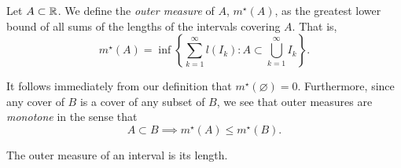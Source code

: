 \begin{definition}
	Let $A \subset \mathbb{R}$.
	We define the \emph{outer measure} of $A$, $m^\star(A)$,
	as the greatest lower bound of all sums of the lengths of the intervals
	covering $A$.
	That is,
	\[
		m^\star(A) = \inf\left\{
			\sum_{k=1}^\infty l(I_k): A \subset
			\bigcup_{k=1}^\infty I_k
		\right\}.
	\]
\end{definition}

It follows immediately from our definition that $m^\star(\varnothing) = 0$.
Furthermore, since any cover of $B$ is a cover of any subset of $B$,
we see that outer measures are \emph{monotone} in the sense that
\[
	A \subset B \implies m^\star(A) \leq m^\star(B).
\]

\begin{proposition}[]
	The outer measure of an interval is its length.
\end{proposition}

